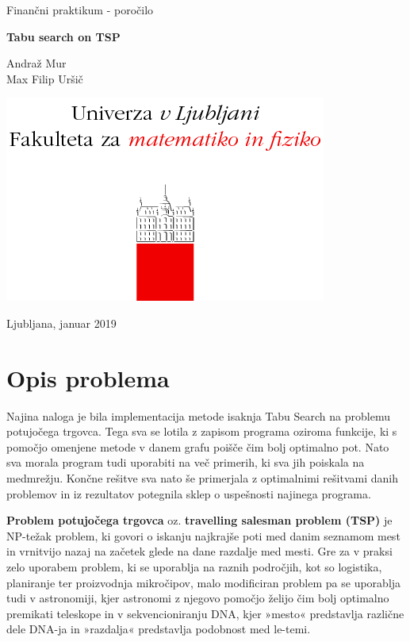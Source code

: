 \documentclass[10pt, a4paper]{article}
\begin{document}
\begin{titlepage}
\begin{center}
\vspace*{1cm}

\Large
Finančni praktikum - poročilo

\vspace{0.5cm}
\LARGE
\textbf{Tabu search on TSP}

\vspace{1.5cm}
\Large
Andraž Mur \\
Max Filip Uršič

\vspace{3cm}
\includegraphics[scale=1]{logo}


\vfill

\large Ljubljana, januar 2019

\end{center}
\end{titlepage}



\tableofcontents

\newpage



\section{Opis problema}

Najina naloga je bila implementacija metode isaknja Tabu Search na problemu potujočega trgovca. Tega sva se lotila z zapisom programa oziroma funkcije, ki s pomočjo omenjene metode v danem grafu poišče čim bolj optimalno pot. Nato sva morala program tudi uporabiti na več primerih, ki sva jih poiskala na medmrežju. Končne rešitve sva nato še primerjala z optimalnimi rešitvami danih problemov in iz rezultatov potegnila sklep o uspešnosti najinega programa.

\bigskip
\textbf{Problem potujočega trgovca} oz. \textbf{travelling salesman problem (TSP)} je NP-težak problem, ki govori o iskanju najkrajše poti med danim seznamom mest in vrnitvijo nazaj na začetek glede na dane razdalje med mesti. Gre za v praksi zelo uporabem problem, ki se uporablja na raznih področjih, kot so logistika, planiranje ter proizvodnja mikročipov, malo modificiran problem pa se uporablja tudi v astronomiji, kjer astronomi z njegovo pomočjo želijo čim bolj optimalno premikati teleskope in v sekvencioniranju DNA, kjer »mesto« predstavlja različne dele DNA-ja in »razdalja« predstavlja podobnost med le-temi.
\end{document}
